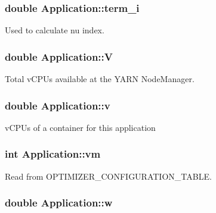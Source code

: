 \hypertarget{classApplication_ad5486702327ad61e56ed04fb54d58c20}{
\subsubsection[{term\-\_\-i}]{\setlength{\rightskip}{0pt plus 5cm}double Application\-::term\-\_\-i}}\label{classApplication_ad5486702327ad61e56ed04fb54d58c20}


Used to calculate nu index. 

\hypertarget{classApplication_aa92ad37e6701931176e0dc9b260fd7ee}{
\subsubsection[{V}]{\setlength{\rightskip}{0pt plus 5cm}double Application\-::\-V}}\label{classApplication_aa92ad37e6701931176e0dc9b260fd7ee}


Total v\-C\-P\-Us available at the Y\-A\-R\-N Node\-Manager. 

\hypertarget{classApplication_a9efc167094a42382504dd28a7ac402e0}{
\subsubsection[{v}]{\setlength{\rightskip}{0pt plus 5cm}double Application\-::v}}\label{classApplication_a9efc167094a42382504dd28a7ac402e0}


v\-C\-P\-Us of a container for this application 

\hypertarget{classApplication_a0a3fe386eb8244e536bc5297709d1269}{
\subsubsection[{vm}]{\setlength{\rightskip}{0pt plus 5cm}int Application\-::vm}}\label{classApplication_a0a3fe386eb8244e536bc5297709d1269}


Read from O\-P\-T\-I\-M\-I\-Z\-E\-R\-\_\-\-C\-O\-N\-F\-I\-G\-U\-R\-A\-T\-I\-O\-N\-\_\-\-T\-A\-B\-L\-E. 

\hypertarget{classApplication_aead1b7b0150c2a3ebd6c36b1db8c4732}{
\subsubsection[{w}]{\setlength{\rightskip}{0pt plus 5cm}double Application\-::w}}\label{classApplication_aead1b7b0150c2a3ebd6c36b1db8c4732}


